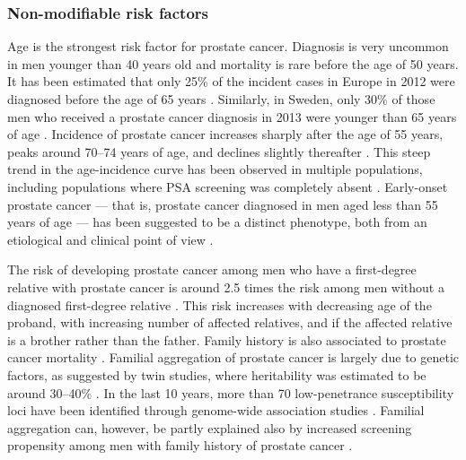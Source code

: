 \subsubsection{Non-modifiable risk factors}
Age is the strongest risk factor for prostate cancer. Diagnosis is very uncommon in men younger than 40 years old and mortality is rare before the age of 50 years. It has been estimated that only 25\% of the incident cases in Europe in 2012 were diagnosed before the age of 65 years \citep{ferlay_cancer_2015}. Similarly, in Sweden, only 30\% of those men who received a prostate cancer diagnosis in 2013 were younger than 65 years of age \citep{socialstyrelsen_cancerincidens_2014}. Incidence of prostate cancer increases sharply after the age of 55 years, peaks around 70--74 years of age, and declines slightly thereafter \citep{ferlay_cancer_2015}. This steep trend in the age-incidence curve has been observed in multiple populations, including populations where PSA screening was completely absent \citep{armitage_age_1954}. Early-onset prostate cancer --- that is, prostate cancer diagnosed in men aged less than 55 years of age --- has been suggested to be a distinct phenotype, both from an etiological and clinical point of view \citep{salinas_prostate_2014}.

The risk of developing prostate cancer among men who have a first-degree relative with prostate cancer is around 2.5 times the risk among men without a diagnosed first-degree relative \citep{zeegers_empiric_2003, kicinski_epidemiological_2011}. This risk increases with decreasing age of the proband, with increasing number of affected relatives, and if the affected relative is a brother rather than the father. Family history is also associated to prostate cancer mortality \citep{brandt_agespecific_2010}. Familial aggregation of prostate cancer is largely due to genetic factors, as suggested by twin studies, where heritability was estimated to be around 30--40\%  \citep{ahlbom_cancer_1997, lichtenstein_environmental_2000, eeles_identification_2013}. In the last 10 years, more than 70 low-penetrance susceptibility loci have been identified through genome-wide association studies \citep{goh_germline_2014}. Familial aggregation can, however, be partly explained also by increased screening propensity among men with family history of prostate cancer \citep{bratt_effects_2010}.

